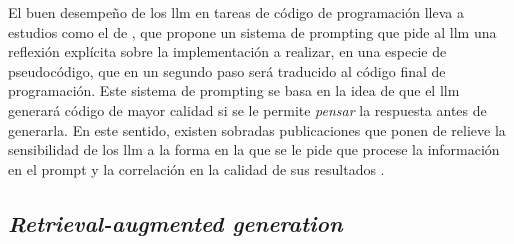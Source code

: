 El buen desempeño de los \gls{llm} en tareas de código de programación lleva a estudios como el de \cite{liStructuredChainofThoughtPrompting2023}, que propone un sistema de prompting que pide al \gls{llm} una reflexión explícita sobre la implementación a realizar, en una especie de pseudocódigo, que en un segundo paso será traducido al código final de programación. Este sistema de prompting se basa en la idea de que el \gls{llm} generará código de mayor calidad si se le permite \emph{pensar} la respuesta antes de generarla. En este sentido, existen sobradas publicaciones que ponen de relieve la sensibilidad de los \gls{llm} a la forma en la que se le pide que procese la información en el prompt y la correlación en la calidad de sus resultados \citep{zhouLeasttoMostPromptingEnables2023,weiChainofThoughtPromptingElicits2023,LLMPromptingGuide}.
 
\subsection{\emph{Retrieval-augmented generation}}
\label{sec:rag}

